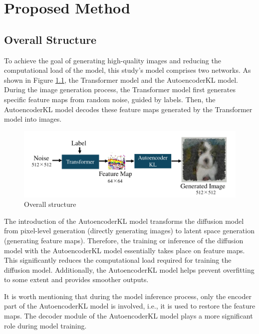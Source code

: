 \documentclass[12pt]{report}
\begin{document}
\chapter{Proposed Method}
\section{Overall Structure}
To achieve the goal of generating high-quality images and reducing the computational load of the model, this study's model comprises two networks. As shown in Figure \ref{fig:overall}, the Transformer model and the AutoencoderKL model. During the image generation process, the Transformer model first generates specific feature maps from random noise, guided by labels. Then, the AutoencoderKL model decodes these feature maps generated by the Transformer model into images.

\begin{figure}[h]
    \centering
    \includegraphics[width=16cm]{image/overall.pdf}
    \caption{Overall structure}
    \label{fig:overall}
\end{figure}

The introduction of the AutoencoderKL model transforms the diffusion model from pixel-level generation (directly generating images) to latent space generation (generating feature maps). Therefore, the training or inference of the diffusion model with the AutoencoderKL model essentially takes place on feature maps. This significantly reduces the computational load required for training the diffusion model. Additionally, the AutoencoderKL model helps prevent overfitting to some extent and provides smoother outputs.

It is worth mentioning that during the model inference process, only the encoder part of the AutoencoderKL model is involved, i.e., it is used to restore the feature maps. The decoder module of the AutoencoderKL model plays a more significant role during model training.
\end{document}
